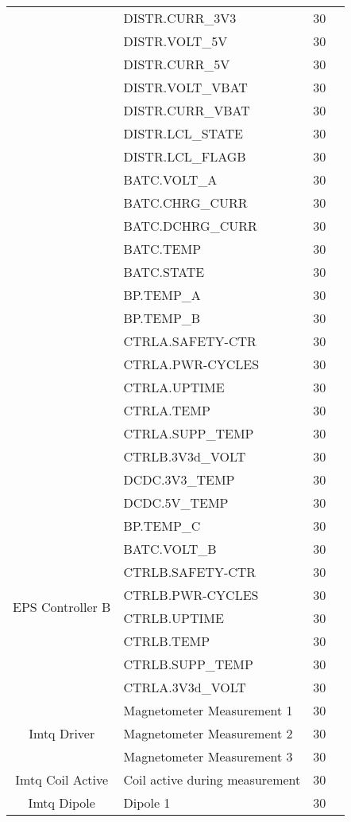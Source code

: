 \begin{longtable}{c|l|c|l}
    & DISTR.CURR_3V3 & 30 \\
    & DISTR.VOLT_5V & 30 \\
    & DISTR.CURR_5V & 30 \\
    & DISTR.VOLT_VBAT & 30 \\
    & DISTR.CURR_VBAT & 30 \\
    & DISTR.LCL_STATE & 30 \\
    & DISTR.LCL_FLAGB & 30 \\
    \cline{2-4}
    & BATC.VOLT_A & 30 \\
    & BATC.CHRG_CURR & 30 \\
    & BATC.DCHRG_CURR & 30 \\
    & BATC.TEMP & 30 \\
    & BATC.STATE & 30 \\
    \cline{2-4}
    & BP.TEMP_A & 30 \\
    & BP.TEMP_B & 30 \\
    \cline{2-4}
    & CTRLA.SAFETY-CTR & 30 \\
    & CTRLA.PWR-CYCLES & 30 \\
    & CTRLA.UPTIME & 30 \\
    & CTRLA.TEMP & 30 \\
    & CTRLA.SUPP_TEMP & 30 \\
    & CTRLB.3V3d_VOLT & 30 \\
    \cline{2-4}
    & DCDC.3V3_TEMP & 30 \\
    & DCDC.5V_TEMP & 30 \\
    \hline
    \multirow{8}{*}{EPS Controller B} & BP.TEMP_C & 30 \\
    & BATC.VOLT_B & 30 \\
    & CTRLB.SAFETY-CTR & 30 \\
    & CTRLB.PWR-CYCLES & 30 \\
    & CTRLB.UPTIME & 30 \\
    & CTRLB.TEMP & 30 \\
    & CTRLB.SUPP_TEMP & 30 \\
    & CTRLA.3V3d_VOLT & 30 \\
    \hline
    \multirow{3}{*}{Imtq Driver} & Magnetometer Measurement 1 & 30 \\
    & Magnetometer Measurement 2 & 30 \\
    & Magnetometer Measurement 3 & 30 \\
    \hline
    Imtq Coil Active & Coil active during measurement & 30 \\
    \hline
    \multirow{3}{*}{Imtq Dipole} & Dipole 1 & 30 \\

\end{longtable}
